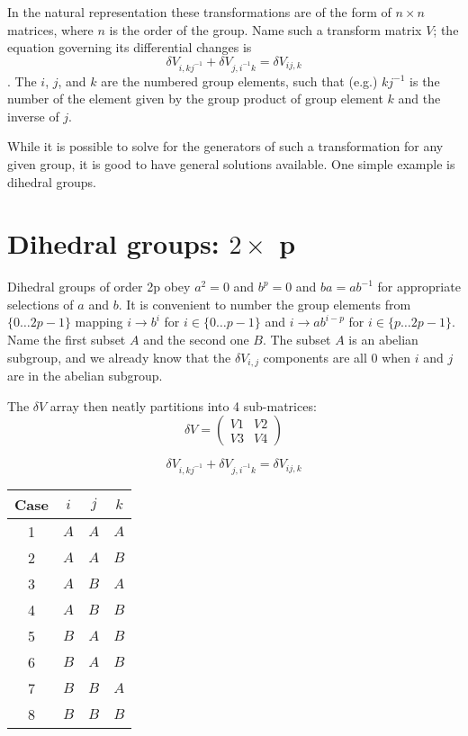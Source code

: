 \documentclass{revtex4-1}
\begin{document}
\par In the natural representation these transformations are of the form of $n \times n$ matrices, where $n$ is the
order of the group.  Name such a transform matrix $V$; the equation governing its differential
changes is $$\delta V_{i,kj^{-1}} + \delta V_{j,i^{-1}k} = \delta V_{ij,k}$$.  The $i$, $j$, and $k$ are the numbered group elements, 
such that (e.g.) $kj^{-1}$ is the number of the element given by the group product of group element $k$ and the inverse of $j$.

\par While it is possible to solve for the generators of such a transformation for any given
group, it is good to have general solutions available.  One simple example is dihedral groups.

\section{Dihedral groups:  $2 \times$ p}
Dihedral groups of order 2p obey $a^2=0$ and $b^p=0$
and $ba=ab^{-1}$ for appropriate selections of $a$ and $b$.  It is convenient
to number the group elements from $\{0\dots 2p-1\}$ mapping $i \rightarrow b^i$ for 
$i \in \{0\dots p-1\}$ and $i \rightarrow ab^{i-p}$ for $i \in \{p\dots 2p-1\}$.
Name the first subset $A$ and the second one $B$.   The subset $A$ is an abelian subgroup,
and we already know that the $\delta V_{i,j}$ components are all $0$ when $i$ and $j$ are
in the abelian subgroup.

\par The $\delta V$ array then neatly partitions into 4 sub-matrices:
\begin{equation}
\delta V = \left(\begin{array}{cc} V1 & V2 \\ V3 & V4
\end{array}\right)
\end{equation}

$$\delta V_{i,kj^{-1}} + \delta V_{j,i^{-1}k} = \delta V_{ij,k}$$

\begin{center}
\begin{tabular}{c|ccc}
Case & $i$ & $j$ & $k$ \\ \hline
1 & $A$ & $A$ & $A$ \\
2 & $A$ & $A$ & $B$ \\
3 & $A$ & $B$ & $A$ \\
4 & $A$ & $B$ & $B$ \\
5 & $B$ & $A$ & $B$ \\
6 & $B$ & $A$ & $B$ \\
7 & $B$ & $B$ & $A$ \\
8 & $B$ & $B$ & $B$ 
\end{tabular}
\end{center}
\end{document}
